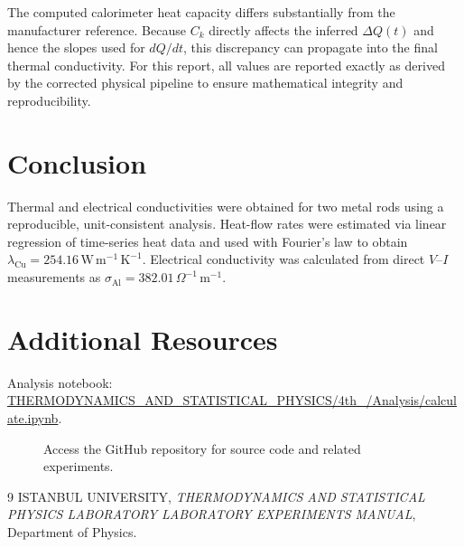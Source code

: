 \documentclass[journal]{IEEEtran}
\begin{document}
The computed calorimeter heat capacity differs substantially from the manufacturer
reference. Because $C_k$ directly affects the inferred $\Delta Q(t)$ and hence the slopes
used for $dQ/dt$, this discrepancy can propagate into the final thermal conductivity.
For this report, all values are reported exactly as derived by the corrected physical pipeline 
to ensure mathematical integrity and reproducibility. 

\section{Conclusion}
Thermal and electrical conductivities were obtained for two metal rods using a
reproducible, unit-consistent analysis. Heat-flow rates were estimated via linear
regression of time-series heat data and used with Fourier's law to obtain
$\lambda_{\text{Cu}}=254.16\,\text{W}\,\text{m}^{-1}\,\text{K}^{-1}$. Electrical conductivity
was calculated from direct $V$--$I$ measurements as
$\sigma_{\text{Al}}=382.01\,\Omega^{-1}\,\text{m}^{-1}$.

\section{Additional Resources}
Analysis notebook: \url{THERMODYNAMICS_AND_STATISTICAL_PHYSICS/4th_/Analysis/calculate.ipynb}.

\begin{figure}[H]
    \centering
    \begin{minipage}{0.15\textwidth}
        \centering
    \end{minipage}%
    \begin{minipage}{0.2\textwidth}
        \raggedright
        \caption{Access the GitHub repository for source code and related experiments.}
        \label{fig:qr_code}
    \end{minipage}
\end{figure}

\begin{thebibliography}{9}
    ISTANBUL UNIVERSITY, \textit{THERMODYNAMICS AND
STATISTICAL PHYSICS
LABORATORY LABORATORY EXPERIMENTS MANUAL}, Department of Physics.


\end{thebibliography}
\end{document}
